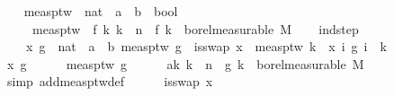 \begin{isabellebody}
\isanewline
\ \ \isamarkupfalse%
\ meas{\isacharunderscore}{\kern0pt}ptw\ {\isacharcolon}{\kern0pt}{\isacharcolon}{\kern0pt}\ {\isachardoublequoteopen}{\isacharparenleft}{\kern0pt}nat\ {\isasymRightarrow}\ {\isacharprime}{\kern0pt}a\ {\isasymRightarrow}\ {\isacharprime}{\kern0pt}b{\isacharparenright}{\kern0pt}\ {\isasymRightarrow}\ bool{\isachardoublequoteclose}\isanewline
\ \ \ \ \ {\isachardoublequoteopen}meas{\isacharunderscore}{\kern0pt}ptw\ {\isacharequal}{\kern0pt}\ {\isacharparenleft}{\kern0pt}{\isasymlambda}f{\isachardot}{\kern0pt}\ {\isacharparenleft}{\kern0pt}{\isasymforall}k{\isachardot}{\kern0pt}\ k\ {\isacharless}{\kern0pt}\ n\ {\isasymlongrightarrow}\ f\ k\ {\isasymin}\ borel{\isacharunderscore}{\kern0pt}measurable\ M{\isacharparenright}{\kern0pt}{\isacharparenright}{\kern0pt}{\isachardoublequoteclose}\isanewline
\isanewline
\ \ \isamarkupfalse%
\ ind{\isacharunderscore}{\kern0pt}step{\isacharcolon}{\kern0pt}\isanewline
\ \ \ \ {\isachardoublequoteopen}{\isasymAnd}x\ {\isacharparenleft}{\kern0pt}g\ {\isacharcolon}{\kern0pt}{\isacharcolon}{\kern0pt}\ nat\ {\isasymRightarrow}\ {\isacharprime}{\kern0pt}a\ {\isasymRightarrow}\ {\isacharprime}{\kern0pt}b{\isacharparenright}{\kern0pt}{\isachardot}{\kern0pt}\ meas{\isacharunderscore}{\kern0pt}ptw\ g\ {\isasymLongrightarrow}\ is{\isacharunderscore}{\kern0pt}swap\ x\ {\isasymLongrightarrow}\ meas{\isacharunderscore}{\kern0pt}ptw\ {\isacharparenleft}{\kern0pt}{\isasymlambda}k\ {\isasymomega}{\isachardot}{\kern0pt}\ x\ {\isacharparenleft}{\kern0pt}{\isasymlambda}i{\isachardot}{\kern0pt}\ g\ i\ {\isasymomega}{\isacharparenright}{\kern0pt}\ k{\isacharparenright}{\kern0pt}{\isachardoublequoteclose}\isanewline
\ \ \isamarkupfalse%
\ {\isacharminus}{\kern0pt}\isanewline
\ \ \ \ \isamarkupfalse%
\ x\ g\isanewline
\ \ \ \ \isamarkupfalse%
\ {\isachardoublequoteopen}meas{\isacharunderscore}{\kern0pt}ptw\ g{\isachardoublequoteclose}\isanewline
\ \ \ \ \isamarkupfalse%
\ a{\isacharcolon}{\kern0pt}{\isachardoublequoteopen}{\isasymAnd}k{\isachardot}{\kern0pt}\ k\ {\isacharless}{\kern0pt}\ n\ {\isasymLongrightarrow}\ g\ k\ {\isasymin}\ borel{\isacharunderscore}{\kern0pt}measurable\ M{\isachardoublequoteclose}\ \isamarkupfalse%
\ {\isacharparenleft}{\kern0pt}simp\ add{\isacharcolon}{\kern0pt}meas{\isacharunderscore}{\kern0pt}ptw{\isacharunderscore}{\kern0pt}def{\isacharparenright}{\kern0pt}\isanewline
\ \ \ \ \isamarkupfalse%
\ {\isachardoublequoteopen}is{\isacharunderscore}{\kern0pt}swap\ x{\isachardoublequoteclose}\isanewline

\end{isabellebody}
